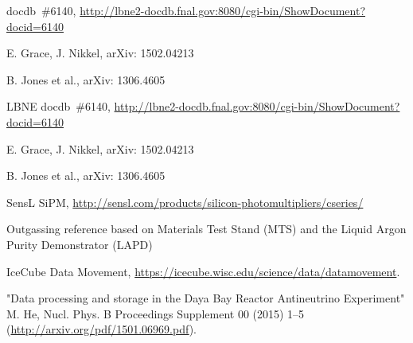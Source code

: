 \begin{thebibliography}{99}

 docdb~\#6140, \url{http://lbne2-docdb.fnal.gov:8080/cgi-bin/ShowDocument?docid=6140}

 E. Grace, J. Nikkel,  arXiv: 1502.04213

 B. Jones et al., arXiv: 1306.4605

 LBNE docdb~\#6140, \url{http://lbne2-docdb.fnal.gov:8080/cgi-bin/ShowDocument?docid=6140}

 E. Grace, J. Nikkel,  arXiv: 1502.04213

 B. Jones et al., arXiv: 1306.4605


 SensL SiPM, \url{http://sensl.com/products/silicon-photomultipliers/cseries/}


%
%




 Outgassing reference based on Materials Test Stand (MTS) and the Liquid Argon Purity Demonstrator (LAPD)

%
%

%
%

%
%

 IceCube Data Movement, \url{https://icecube.wisc.edu/science/data/datamovement}.

"Data processing and storage in the Daya Bay Reactor Antineutrino Experiment" M. He, Nucl. Phys. B Proceedings Supplement 00 (2015) 1–5 (\url{http://arxiv.org/pdf/1501.06969.pdf}).


\end{thebibliography}
